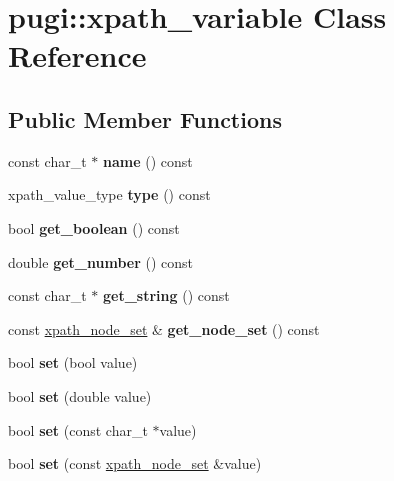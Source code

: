 \hypertarget{classpugi_1_1xpath__variable}{}\section{pugi\+:\+:xpath\+\_\+variable Class Reference}
\label{classpugi_1_1xpath__variable}
\subsection*{Public Member Functions}
\begin{DoxyCompactItemize}
\item 
\mbox{\label{classpugi_1_1xpath__variable_acf2ab53ee69f0b436c1b3b62bd455eaf}} 
const char\+\_\+t $\ast$ {\bfseries name} () const
\item 
\mbox{\label{classpugi_1_1xpath__variable_ac529e1947d1c17a3c5e5d899dee56a67}} 
xpath\+\_\+value\+\_\+type {\bfseries type} () const
\item 
\mbox{\label{classpugi_1_1xpath__variable_a6431efb3f32d7dfc09920c32e6125edd}} 
bool {\bfseries get\+\_\+boolean} () const
\item 
\mbox{\label{classpugi_1_1xpath__variable_a432a2def9b4a723d83fa216065e64905}} 
double {\bfseries get\+\_\+number} () const
\item 
\mbox{\label{classpugi_1_1xpath__variable_a506d7dce959dcc683834ac1e4b48592e}} 
const char\+\_\+t $\ast$ {\bfseries get\+\_\+string} () const
\item 
\mbox{\label{classpugi_1_1xpath__variable_a9faadbcf106b0c547cd7297fdecf2174}} 
const \hyperlink{classpugi_1_1xpath__node__set}{xpath\+\_\+node\+\_\+set} \& {\bfseries get\+\_\+node\+\_\+set} () const
\item 
\mbox{\label{classpugi_1_1xpath__variable_a1e6ee8876fba9f01373df452416e48fb}} 
bool {\bfseries set} (bool value)
\item 
\mbox{\label{classpugi_1_1xpath__variable_ae92b5bdaf24fa6f94f281ae5d046d56a}} 
bool {\bfseries set} (double value)
\item 
\mbox{\label{classpugi_1_1xpath__variable_acaedec0610338a1165bbcd0658db34f9}} 
bool {\bfseries set} (const char\+\_\+t $\ast$value)
\item 
\mbox{\label{classpugi_1_1xpath__variable_aad7a9022098440aeac16ef90d849aee4}} 
bool {\bfseries set} (const \hyperlink{classpugi_1_1xpath__node__set}{xpath\+\_\+node\+\_\+set} \&value)
\end{DoxyCompactItemize}
